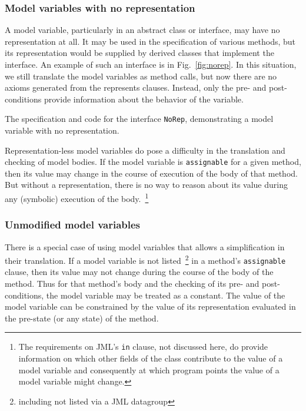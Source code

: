 \documentclass{sig-alternate}
\begin{document}
\subsubsection{Model variables with no representation}

A model variable, particularly in an abstract class or interface, may have no representation
at all.  It may be used in the specification of various methods, but its representation would be
supplied by derived classes that implement the interface.  An example of such an interface is
in Fig.~\ref{fig:norep}.  In this situation, we still translate the model variables as method calls,
but now there are no axioms generated from the represents clauses.  Instead, only the
pre- and post-conditions provide information about the behavior of the variable.

\begin{BFIGURE}

\caption{The specification and code for the interface \texttt{NoRep},
demonstrating a model variable with no representation.}
\label{fig:norep}
\end{BFIGURE}

Representation-less model variables do pose a difficulty in the translation and checking of model bodies.  If the model variable is \texttt{assignable} for a given method, then its value may 
change in the course of execution of the body of that method.  But without a representation,
there is no way to reason about its value during any (symbolic) execution of the 
body.~\footnote{The requirements on JML's  \texttt{in} clause, not discussed here, do provide information
on which other fields of the class contribute to the value of a model variable and consequently
at which program points the value of a model variable might change.}

\subsubsection{Unmodified model variables}

There is a special case of using model variables that allows a simplification in their translation.
If a model variable is not listed~\footnote{including not listed via a JML datagroup} in a
method's \texttt{assignable} clause, then its value may not change during the course of the
body of the method.  Thus for that method's body and the checking of its pre- and
post-conditions, the model variable may be treated as a constant.  The value of the model 
variable can be constrained by the value of its representation evaluated in the pre-state
(or any state) of the method.
\end{document}
